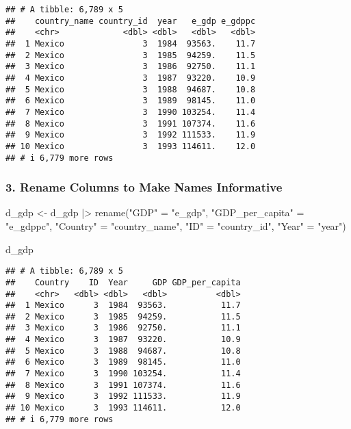 \documentclass[
]{article}
\newenvironment{Shaded}{\begin{snugshade}}{\end{snugshade}}
\newcommand{\FunctionTok}[1]{\textcolor[rgb]{0.00,0.00,0.00}{#1}}
\newcommand{\NormalTok}[1]{#1}
\newcommand{\OtherTok}[1]{\textcolor[rgb]{0.56,0.35,0.01}{#1}}
\newcommand{\SpecialCharTok}[1]{\textcolor[rgb]{0.00,0.00,0.00}{#1}}
\newcommand{\StringTok}[1]{\textcolor[rgb]{0.31,0.60,0.02}{#1}}
\begin{document}
\begin{verbatim}
## # A tibble: 6,789 x 5
##    country_name country_id  year   e_gdp e_gdppc
##    <chr>             <dbl> <dbl>   <dbl>   <dbl>
##  1 Mexico                3  1984  93563.    11.7
##  2 Mexico                3  1985  94259.    11.5
##  3 Mexico                3  1986  92750.    11.1
##  4 Mexico                3  1987  93220.    10.9
##  5 Mexico                3  1988  94687.    10.8
##  6 Mexico                3  1989  98145.    11.0
##  7 Mexico                3  1990 103254.    11.4
##  8 Mexico                3  1991 107374.    11.6
##  9 Mexico                3  1992 111533.    11.9
## 10 Mexico                3  1993 114611.    12.0
## # i 6,779 more rows
\end{verbatim}

\hypertarget{rename-columns-to-make-names-informative}{%
\subsubsection{3. Rename Columns to Make Names
Informative}\label{rename-columns-to-make-names-informative}}

\begin{Shaded}
\begin{Highlighting}[]
\NormalTok{d\_gdp }\OtherTok{\textless{}{-}}\NormalTok{ d\_gdp }\SpecialCharTok{|\textgreater{}}
  \FunctionTok{rename}\NormalTok{(}\StringTok{"GDP"} \OtherTok{=} \StringTok{"e\_gdp"}\NormalTok{, }\StringTok{"GDP\_per\_capita"} \OtherTok{=} \StringTok{"e\_gdppc"}\NormalTok{,}
         \StringTok{"Country"} \OtherTok{=} \StringTok{"country\_name"}\NormalTok{, }\StringTok{"ID"} \OtherTok{=} \StringTok{"country\_id"}\NormalTok{,}
         \StringTok{"Year"} \OtherTok{=} \StringTok{"year"}\NormalTok{)}

\NormalTok{d\_gdp}
\end{Highlighting}
\end{Shaded}

\begin{verbatim}
## # A tibble: 6,789 x 5
##    Country    ID  Year     GDP GDP_per_capita
##    <chr>   <dbl> <dbl>   <dbl>          <dbl>
##  1 Mexico      3  1984  93563.           11.7
##  2 Mexico      3  1985  94259.           11.5
##  3 Mexico      3  1986  92750.           11.1
##  4 Mexico      3  1987  93220.           10.9
##  5 Mexico      3  1988  94687.           10.8
##  6 Mexico      3  1989  98145.           11.0
##  7 Mexico      3  1990 103254.           11.4
##  8 Mexico      3  1991 107374.           11.6
##  9 Mexico      3  1992 111533.           11.9
## 10 Mexico      3  1993 114611.           12.0
## # i 6,779 more rows
\end{verbatim}
\end{document}
